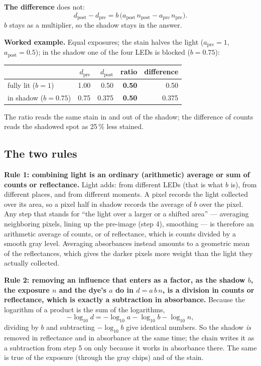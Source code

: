 \documentclass[11pt,letter]{article}
\begin{document}
\noindent\textbf{The difference} does not:
\begin{equation}
  d_\text{post} - d_\text{pre}
  = b\,\bigl(a_\text{post}\, n_\text{post} - a_\text{pre}\, n_\text{pre}\bigr).
\end{equation}
$b$ stays as a multiplier, so the shadow stays in the answer.

\noindent\textbf{Worked example.}  Equal exposures; the stain halves the
light ($a_\text{pre} = 1$, $a_\text{post} = 0.5$); in the shadow one of the
four LEDs is blocked ($b = 0.75$):

\medskip
\begin{center}
\begin{tabular}{@{}lrrrr@{}}
\toprule
 & $d_\text{pre}$ & $d_\text{post}$ & ratio & difference \\
\midrule
fully lit ($b = 1$)    & 1.00 & 0.50  & \textbf{0.50} & 0.50 \\
in shadow ($b = 0.75$) & 0.75 & 0.375 & \textbf{0.50} & 0.375 \\
\bottomrule
\end{tabular}
\end{center}

\noindent The ratio reads the same stain in and out of the shadow; the
difference of counts reads the shadowed spot as 25\,\% less stained.

\subsection{The two rules}

\textbf{Rule 1: combining light is an ordinary (arithmetic) average or sum
of counts or reflectance.}  Light adds: from different LEDs (that is what
$b$ is), from different places, and from different moments.  A pixel
records the light collected over its area, so a pixel half in shadow
records the average of $b$ over the pixel.  Any step that stands for ``the
light over a larger or a shifted area'' --- averaging neighboring pixels,
lining up the pre-image (step 4), smoothing --- is therefore an arithmetic
average of counts, or of reflectance, which is counts divided by a smooth
gray level.  Averaging absorbances instead amounts to a geometric mean of
the reflectances, which gives the darker pixels more weight than the light
they actually collected.

\textbf{Rule 2: removing an influence that enters as a factor, as the
shadow $b$, the exposure $n$ and the dye's $a$ do in $d = a\,b\,n$, is a
division in counts or reflectance, which is exactly a subtraction in
absorbance.}  Because the logarithm of a product is the sum of the
logarithms,
\begin{equation}
  -\log_{10} d = -\log_{10} a - \log_{10} b - \log_{10} n ,
\end{equation}
dividing by $b$ and subtracting $-\log_{10} b$ give identical numbers.  So
the shadow \emph{is} removed in reflectance and in absorbance at the same
time; the chain writes it as a subtraction from step 5 on only because it
works in absorbance there.  The same is true of the exposure (through the
gray chips) and of the stain.
\end{document}
